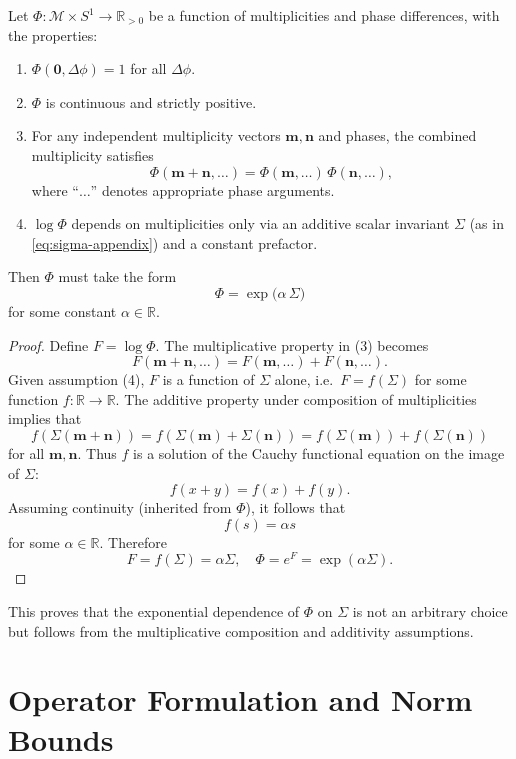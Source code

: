 \documentclass[11pt]{article}
\begin{document}
\begin{proposition}
Let \(\Phi: \mathcal{M} \times S^1 \to \mathbb{R}_{>0}\) be a function of multiplicities and phase differences, with the properties:
\begin{enumerate}
\item \(\Phi(\mathbf{0},\Delta\phi) = 1\) for all \(\Delta\phi\).
\item \(\Phi\) is continuous and strictly positive.
\item For any independent multiplicity vectors \(\mathbf{m},\mathbf{n}\) and phases, the combined multiplicity satisfies
\[
\Phi(\mathbf{m}+\mathbf{n},\ldots) = \Phi(\mathbf{m},\ldots)\,\Phi(\mathbf{n},\ldots),
\]
where ``\(\ldots\)'' denotes appropriate phase arguments.
\item \(\log\Phi\) depends on multiplicities only via an additive scalar invariant \(\Sigma\) (as in \eqref{eq:sigma-appendix}) and a constant prefactor.
\end{enumerate}
Then \(\Phi\) must take the form
\[
\Phi = \exp\!\big(\alpha\,\Sigma\big)
\]
for some constant \(\alpha\in\mathbb{R}\).
\end{proposition}

\begin{proof}
Define \(F = \log\Phi\). The multiplicative property in (3) becomes
\[
F(\mathbf{m}+\mathbf{n},\ldots) = F(\mathbf{m},\ldots) + F(\mathbf{n},\ldots).
\]
Given assumption (4), \(F\) is a function of \(\Sigma\) alone, i.e.\ \(F = f(\Sigma)\) for some function \(f\colon\mathbb{R}\to\mathbb{R}\). The additive property under composition of multiplicities implies that
\[
f(\Sigma(\mathbf{m}+\mathbf{n})) = f(\Sigma(\mathbf{m}) + \Sigma(\mathbf{n})) 
= f(\Sigma(\mathbf{m})) + f(\Sigma(\mathbf{n}))
\]
for all \(\mathbf{m},\mathbf{n}\). Thus \(f\) is a solution of the Cauchy functional equation on the image of \(\Sigma\):
\[
f(x+y) = f(x) + f(y).
\]
Assuming continuity (inherited from \(\Phi\)), it follows that
\[
f(s) = \alpha s
\]
for some \(\alpha\in\mathbb{R}\). Therefore
\[
F = f(\Sigma) = \alpha\Sigma,\quad \Phi = e^{F} = \exp(\alpha\Sigma).
\]
\end{proof}

This proves that the exponential dependence of \(\Phi\) on \(\Sigma\) is not an arbitrary choice but follows from the multiplicative composition and additivity assumptions.

\section{Operator Formulation and Norm Bounds}
\end{document}
